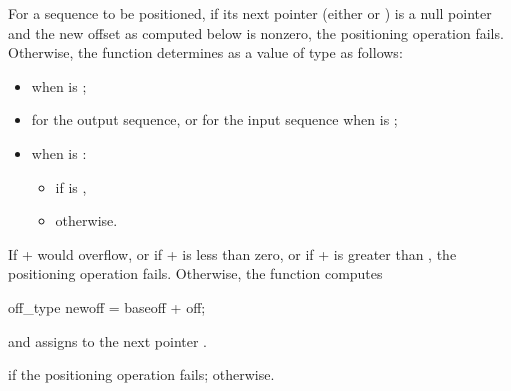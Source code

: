 \documentclass[ebook,11pt,article]{memoir}
\renewcommand{\iref}[1]{[#1]}
\begin{document}
\begin{itemdescr}
\pnum
For a sequence to be positioned, if its next pointer 
(either
or
)
is a null pointer and the new offset  as computed below is nonzero, the positioning
operation fails. Otherwise, the function determines  as a value of type  as follows:
\begin{itemize}
\item {} when  is ;
\item {} for the output sequence, or \newline
       for the input sequence when  is ;
\item when  is  :  
\begin{itemize}
\item {} if  is , 
\item {} otherwise.
\end{itemize}
\end{itemize}




%

\pnum
If  +  would overflow, or 
if  +  is less than zero, or 
if  +  is greater than ,
the positioning operation fails.
Otherwise, the function computes 
\begin{codeblock}
off_type newoff = baseoff + off;
\end{codeblock}
and assigns
to the next pointer .

\pnum
\returns
{} if the positioning operation fails;
 otherwise.
\end{itemdescr}
\end{document}

